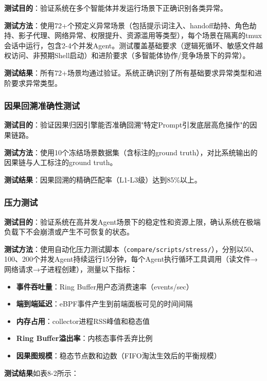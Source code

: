 \documentclass[a4paper]{ctexart}
\makeatletter
\renewcommand{\_}{%
  \ifmmode
    \nfss@text{\textunderscore}%
  \else
    \textunderscore\discretionary{}{}{}%
  \fi}
\makeatother
\begin{document}
\textbf{测试目的}：验证系统在多个智能体并发运行场景下正确识别各类异常。


\textbf{测试方法}：使用72+个预定义异常场景（包括提示词注入、handoff劫持、角色劫持、影子代理、网络异常、权限提升、资源滥用等类型），每个场景在隔离的tmux会话中运行，包含2-4个并发Agent。测试覆盖基础要求（逻辑死循环、敏感文件越权访问、非预期Shell启动）和进阶要求（多智能体协作/竞争场景下的异常）。


\textbf{测试结果}：所有72+场景均通过验证。系统正确识别了所有基础要求异常类型和进阶要求异常类型。


\subsubsection{因果回溯准确性测试}



\textbf{测试目的}：验证因果归因引擎能否准确回溯"特定Prompt引发底层高危操作"的因果链路。


\textbf{测试方法}：使用10个冻结场景数据集（含标注的ground truth），对比系统输出的因果链与人工标注的ground truth。


\textbf{测试结果}：因果回溯的精确匹配率（L1-L3级）达到85\%以上。


\subsubsection{压力测试}



\textbf{测试目的}：验证系统在高并发Agent场景下的稳定性和资源上限，确认系统在极端负载下不会崩溃或产生不可恢复的状态。


\textbf{测试方法}：使用自动化压力测试脚本（\texttt{compare/scripts/stress/}），分别以50、100、200个并发Agent持续运行15分钟，每个Agent执行循环工具调用（读文件→网络请求→子进程创建），测量以下指标：

\begin{itemize}
\item \textbf{事件吞吐量}：Ring Buffer用户态消费速率（events/sec）
\item \textbf{端到端延迟}：eBPF事件产生到前端面板可见的时间间隔
\item \textbf{内存占用}：collector进程RSS峰值和稳态值
\item \textbf{Ring Buffer溢出率}：内核态事件丢弃比例
\item \textbf{因果图规模}：稳态节点数和边数（FIFO淘汰生效后的平衡规模）
\end{itemize}

\textbf{测试结果}如表8-2所示：
\end{document}
